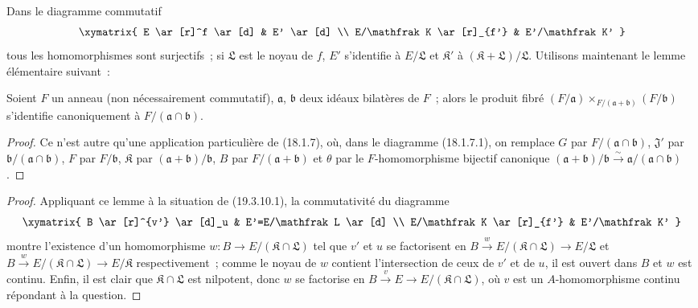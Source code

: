 Dans le diagramme commutatif
\[
\xymatrix{
  E \ar[r]^f \ar[d] & E' \ar[d] \\
  E/\mathfrak K \ar[r]_{f'} & E'/\mathfrak K'
}
\]
tous les homomorphismes sont surjectifs~; si $\mathfrak L$ est le noyau de
$f$, $E'$ s'identifie à $E/\mathfrak L$ et $\mathfrak K'$ à
$(\mathfrak K+\mathfrak L)/\mathfrak L$. Utilisons maintenant le lemme
élémentaire suivant~:

\begin{lemma}[19.3.10.2]
\label{0.19.3.10.2-fr}
Soient $F$ un anneau (non nécessairement commutatif), $\mathfrak a$,
$\mathfrak b$ deux idéaux bilatères de $F$~; alors le produit fibré
$(F/\mathfrak a)\times_{F/(\mathfrak a+\mathfrak b)}(F/\mathfrak b)$
s'identifie canoniquement à $F/(\mathfrak a\cap\mathfrak b)$.
\end{lemma}

\begin{proof}
Ce n'est autre qu'une application particulière de (18.1.7), où, dans le
diagramme (18.1.7.1), on remplace $G$ par
$F/(\mathfrak a\cap\mathfrak b)$, $\mathfrak J'$ par
$\mathfrak b/(\mathfrak a\cap\mathfrak b)$, $F$ par
$F/\mathfrak b$, $\mathfrak K$ par
$(\mathfrak a+\mathfrak b)/\mathfrak b$, $B$ par
$F/(\mathfrak a+\mathfrak b)$ et $\theta$ par le $F$-homomorphisme
bijectif canonique
$(\mathfrak a+\mathfrak b)/\mathfrak b\xrightarrow{\sim}
\mathfrak a/(\mathfrak a\cap\mathfrak b)$.
\end{proof}


\begin{proof}
Appliquant ce lemme à la situation de (19.3.10.1), la commutativité du
diagramme
\[
\xymatrix{
  B \ar[r]^{v'} \ar[d]_u & E'=E/\mathfrak L \ar[d] \\
  E/\mathfrak K \ar[r]_{f'} & E'/\mathfrak K'
}
\]
montre l'existence d'un homomorphisme
$w:B\to E/(\mathfrak K\cap\mathfrak L)$ tel que $v'$ et $u$ se
factorisent en
$B\xrightarrow{w}E/(\mathfrak K\cap\mathfrak L)\to E/\mathfrak L$
et
$B\xrightarrow{w}E/(\mathfrak K\cap\mathfrak L)\to E/\mathfrak K$
respectivement~; comme le noyau de $w$ contient l'intersection de ceux de
$v'$ et de $u$, il est ouvert dans $B$ et $w$ est continu. Enfin, il est clair
que $\mathfrak K\cap\mathfrak L$ est nilpotent, donc $w$ se factorise en
$B\xrightarrow{v}E\to E/(\mathfrak K\cap\mathfrak L)$, où $v$ est
un $A$-homomorphisme continu répondant à la question.
\end{proof}

